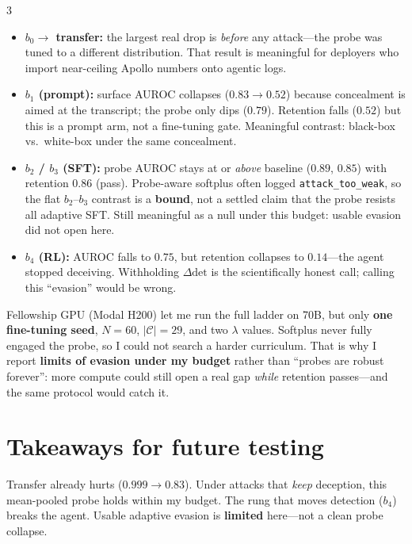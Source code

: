 \documentclass[final]{beamer}
\newcommand{\deltadet}{\ensuremath{\Delta\mathrm{det}}}
\begin{document}
\begin{frame}[t]
\begin{multicols}{3}
\begin{itemize}
  \item \textbf{$b_0\to$ transfer:} the largest real drop is
  \emph{before} any attack---the probe was tuned to a different
  distribution. That result is meaningful for deployers who import
  near-ceiling Apollo numbers onto agentic logs.
  \item \textbf{$b_1$ (prompt):} surface AUROC collapses ($0.83\to0.52$)
  because concealment is aimed at the transcript; the probe only dips
  ($0.79$). Retention falls ($0.52$) but this is a prompt arm, not a
  fine-tuning gate. Meaningful contrast: black-box vs.\ white-box under
  the same concealment.
  \item \textbf{$b_2$ / $b_3$ (SFT):} probe AUROC stays at or
  \emph{above} baseline ($0.89$, $0.85$) with retention $0.86$ (pass).
  Probe-aware softplus often logged \texttt{attack\_too\_weak}, so the
  flat $b_2$--$b_3$ contrast is a \textbf{bound}, not a settled claim
  that the probe resists all adaptive SFT. Still meaningful as a null
  under this budget: usable evasion did not open here.
  \item \textbf{$b_4$ (RL):} AUROC falls to $0.75$, but retention
  collapses to $0.14$---the agent stopped deceiving. Withholding
  $\deltadet$ is the scientifically honest call; calling this ``evasion''
  would be wrong.
\end{itemize}

 Fellowship GPU
(Modal H200) let me run the full ladder on 70B, but only
\textbf{one fine-tuning seed}, $N{=}60$, $|\mathcal{C}|{=}29$, and two
$\lambda$ values. Softplus never fully engaged the probe, so I could not
search a harder curriculum. That is why I report \textbf{limits of
evasion under my budget} rather than ``probes are robust forever'': more
compute could still open a real gap \emph{while} retention passes---and
the same protocol would catch it.

\section{Takeaways for future testing}

 Transfer already hurts ($0.999\to0.83$). Under
attacks that \emph{keep} deception, this mean-pooled probe holds within my
budget. The rung that moves detection ($b_4$) breaks the agent. Usable
adaptive evasion is \textbf{limited} here---not a clean probe collapse.


\end{multicols}
\end{frame}
\end{document}
